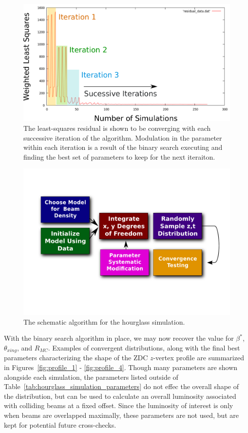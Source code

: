 \begin{figure}[h]
  \centering
  \includegraphics[width=0.8\linewidth]{./figures/vernier_root_finding.png}
  \caption{
    The least-squares residual is shown to be converging with each
    successive iteration of the algorithm. Modulation in the parameter within
    each iteration is a result of the binary search executing and finding the
    best set of parameters to keep for the next iteraiton.
  }
  \label{fig:least_squares_convergence}
\end{figure}


\begin{figure}[h]
  \centering
  \includegraphics[width=0.8\linewidth]{./figures/simulation_flow.pdf}
  \caption{The schematic algorithm for the hourglass simulation.}
  \label{fig:simulation_flow}
\end{figure}

With the binary search algorithm in place, we may now recover the value for
$\beta^*$, $\theta_{xing}$, and $R_{MC}$. Examples of convergent distributions,
along with the final best parameters characterizing the shape of the ZDC
$z$-vertex profile are summarized in Figures~\ref{fig:profile_1} -
\ref{fig:profile_4}. Though many parameters are shown alongside each simulation,
the parameters listed outside of Table~\ref{tab:hourglass_simulation_parameters}
do not effec the overall shape of the distribution, but can be used to calculate
an overall luminosity associated with colliding beams at a fixed offset. Since
the luminosity of interest is only when beams are overlapped maximally, these
parameters are not used, but are kept for potential future cross-checks.

